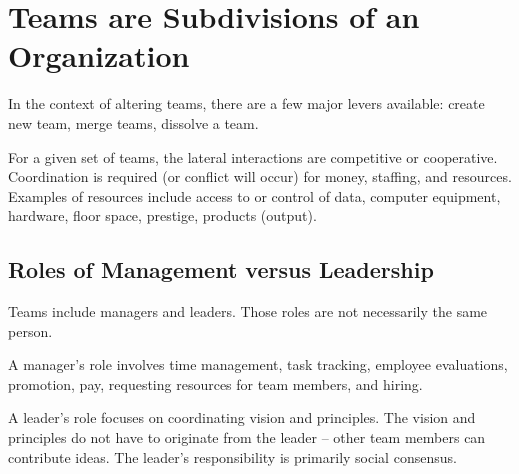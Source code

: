 

\section{Teams are Subdivisions of an Organization}

\cite{2015_Katzenbach}

In the context of altering teams, there are a few major levers available: create new team, merge teams, dissolve a team. 


For a given set of teams, the lateral interactions are competitive or cooperative. Coordination is required (or conflict will occur) for money, staffing, and resources. Examples of resources include access to or control of data, computer equipment, hardware, floor space, prestige, products (output).

\subsection*{Roles of Management versus Leadership}

Teams include managers and leaders. Those roles are not necessarily the same person. 

A manager's role involves time management, task tracking, employee evaluations, promotion, pay, requesting resources for team members, and hiring. 

A leader's role focuses on coordinating vision and principles. The vision and principles do not have to originate from the leader -- other team members can contribute ideas. The leader's responsibility is primarily social consensus. 